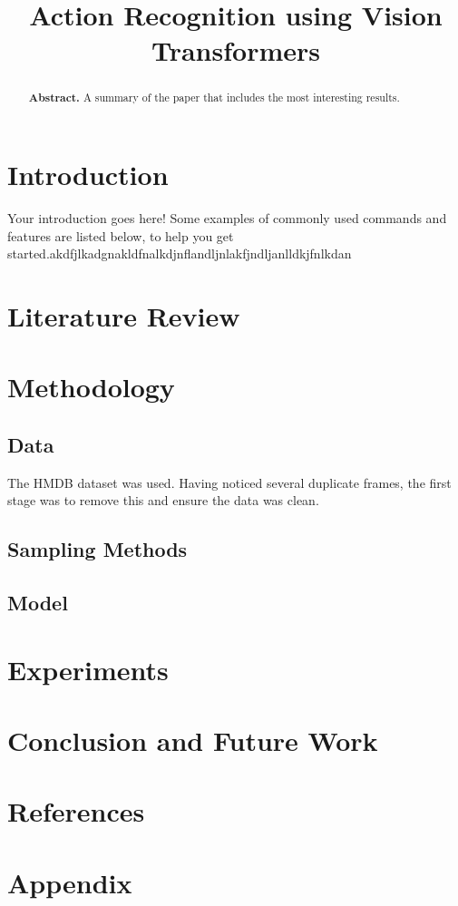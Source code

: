 \documentclass[twocolumn,showpacs,%
  nofootinbib,aps,superscriptaddress,%
  eqsecnum,prd,notitlepage,showkeys,10pt]{IEEEtran}
\begin{document}
\title{Action Recognition using Vision Transformers}
\author{
}
\maketitle

\begin{abstract}
\textbf{Abstract.} A summary of the paper that includes the most interesting results.
\end{abstract}

\section{Introduction}

Your introduction goes here! Some examples of commonly used commands and features are listed below, to help you get started.akdfjlkadgnakldfnalkdjnflandljnlakfjndljanlldkjfnlkdan


\section{Literature Review}



\section{Methodology}
\subsection{Data}
The HMDB dataset was used. Having noticed several duplicate frames, the first stage was to remove this and ensure the data was clean. 

\subsection{Sampling Methods}
\subsection{Model}


\section{Experiments}




\section{Conclusion and Future Work}

\section{References}

\section{Appendix}
\end{document}
